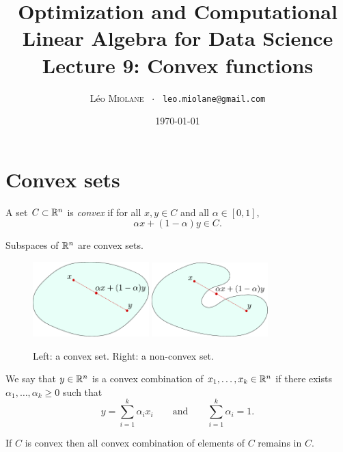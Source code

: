 \documentclass[11pt,nocut]{article}
\title{\vspace{-2.0cm}%
	Optimization and Computational Linear Algebra for Data Science\\
Lecture 9: Convex functions}
\author{Léo \textsc{Miolane} \ $\cdot$ \ \texttt{leo.miolane@gmail.com}}
\date{\today}
\begin{document}
\maketitle


\section{Convex sets}

\begin{definition}
	A set $C \subset \mathbb{R}^n$ is \emph{convex} if for all $x,y \in C$ and all $\alpha \in [0,1]$,
	$$
	\alpha x + (1-\alpha) y \in C.
	$$
\end{definition}

\begin{remark}
	Subspaces of $\mathbb{R}^n$ are convex sets.
\end{remark}

\begin{figure}[h!]
	\begin{center}
	\includegraphics[width=0.4\textwidth]{figures/convex.pdf}
	\hspace{0.9cm}
	\includegraphics[width=0.4\textwidth]{figures/non_convex.pdf}
	\end{center}
	\caption{Left: a convex set. Right: a non-convex set.}
\end{figure}
\begin{definition}
	We say that $y \in \mathbb{R}^n$ is a convex combination of $x_1, \dots, x_k \in \mathbb{R}^n$ if there exists $\alpha_1, \dots, \alpha_k \geq 0$ such that
	$$
	y = \sum_{i=1}^k \alpha_i x_i \qquad \text{and} \qquad \sum_{i=1}^k \alpha_i = 1.
	$$
\end{definition}

\begin{proposition}
	If $C$ is convex then all convex combination of elements of $C$ remains in $C$.
\end{proposition}
\end{document}
